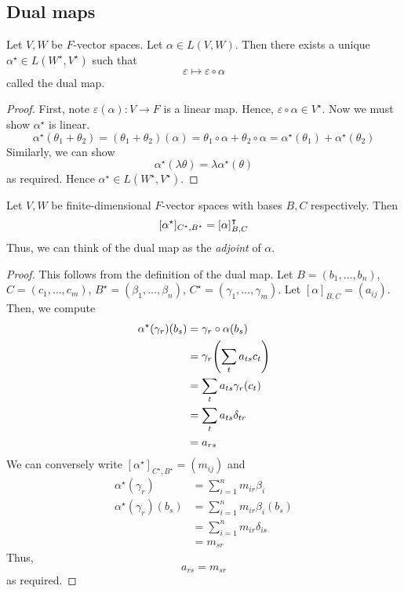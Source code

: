 \subsection{Dual maps}
\begin{lemma}
	Let \( V, W \) be \( F \)-vector spaces.
	Let \( \alpha \in L(V,W) \).
	Then there exists a unique \( \alpha^\star \in L(W^\star, V^\star) \) such that
	\[
		\varepsilon \mapsto \varepsilon \circ \alpha
	\]
	called the dual map.
\end{lemma}
\begin{proof}
	First, note \( \varepsilon(\alpha) \colon V \to F \) is a linear map.
	Hence, \( \varepsilon \circ \alpha \in V^\star \).
	Now we must show \( \alpha^\star \) is linear.
	\[
		\alpha^\star(\theta_1 + \theta_2) = (\theta_1 + \theta_2)(\alpha) = \theta_1 \circ \alpha + \theta_2 \circ \alpha = \alpha^\star(\theta_1) + \alpha^\star(\theta_2)
	\]
	Similarly, we can show
	\[
		\alpha^\star(\lambda \theta) = \lambda \alpha^\star(\theta)
	\]
	as required.
	Hence \( \alpha^\star \in L(W^\star, V^\star) \).
\end{proof}
\begin{proposition}
	Let \( V, W \) be finite-dimensional \( F \)-vector spaces with bases \( B, C \) respectively.
	Then
	\[
		[\alpha^\star]_{C^\star, B^\star} = [\alpha]^\intercal_{B, C}
	\]
	Thus, we can think of the dual map as the \textit{adjoint} of \( \alpha \).
\end{proposition}
\begin{proof}
	This follows from the definition of the dual map.
	Let \( B = (b_1, \dots, b_n) \), \( C = (c_1, \dots, c_m) \), \( B^\star = (\beta_1, \dots, \beta_n) \), \( C^\star = (\gamma_1, \dots, \gamma_m) \).
	Let \( [\alpha]_{B,C} = (a_{ij}) \).
	Then, we compute
	\begin{align*}
		\alpha^\star(\gamma_r)(b_s) & = \gamma_r \circ \alpha(b_s)         \\
		                            & = \gamma_r \qty( \sum_t a_{ts} c_t ) \\
		                            & = \sum_t a_{ts} \gamma_r(c_t)        \\
		                            & = \sum_t a_{ts} \delta_{tr}          \\
		                            & = a_{rs}
	\end{align*}
	We can conversely write \( [\alpha^\star]_{C^\star, B^\star} = (m_{ij}) \) and
	\begin{align*}
		\alpha^\star(\gamma_r)      & = \sum_{i=1}^n m_{ir} \beta_i      \\
		\alpha^\star(\gamma_r)(b_s) & = \sum_{i=1}^n m_{ir} \beta_i(b_s) \\
		                            & = \sum_{i=1}^n m_{ir} \delta_{is}  \\
		                            & = m_{sr}
	\end{align*}
	Thus,
	\[
		a_{rs} = m_{sr}
	\]
	as required.
\end{proof}

